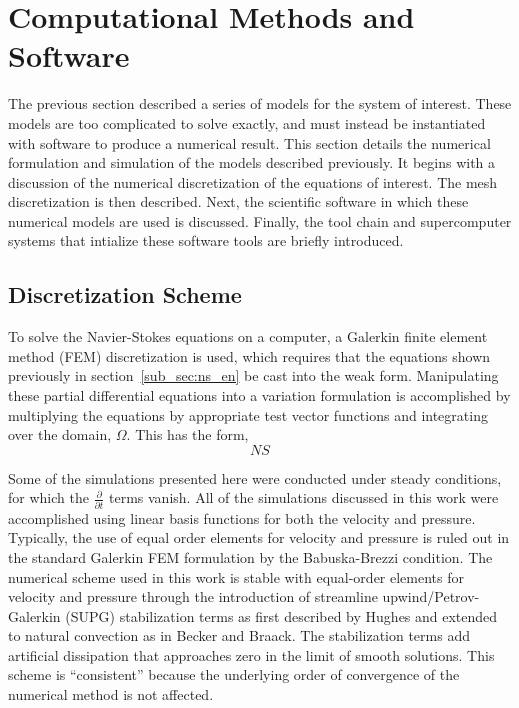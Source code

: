\section{Computational Methods and Software}
\label{sec:software}

The previous section described a series of models 
for the system of interest. These models are too 
complicated to solve exactly, and must instead be 
instantiated with software to produce a numerical 
result. This section details the numerical formulation
and simulation of the models described previously. It begins with a 
discussion of the numerical discretization of the equations 
of interest. The mesh discretization is then described. 
Next, the scientific software in which these numerical 
models are used is discussed. Finally, the tool
chain and supercomputer systems that intialize these 
software tools are briefly introduced. 

\subsection{Discretization Scheme}

To solve the Navier-Stokes equations on a computer, a
Galerkin finite element method (FEM) discretization is used, which
requires that the equations shown previously in section~\ref{sub_sec:ns_en}
be cast into the weak form. Manipulating
these partial differential equations into a variation formulation is
accomplished by multiplying the equations by appropriate test vector
functions and integrating over the domain, $\Omega$. This has the
form,  
\begin{equation}
 NS
  \label{eqn:ns_weak}
\end{equation}

Some of the simulations presented here were conducted under steady
conditions, for which the $\frac{\partial}{\partial t}$ terms vanish. 
All of the simulations discussed in this work were accomplished using
linear basis functions for both the velocity and pressure.
Typically, the use of equal order elements for velocity and pressure is
ruled out in the standard Galerkin FEM formulation by the Babuska-Brezzi
condition\cite{bb-cond}. The numerical scheme used in this work is
stable with equal-order elements for velocity and pressure through the
introduction of streamline upwind/Petrov-Galerkin (SUPG) stabilization
terms as first described by Hughes\cite{Hughes198685,supg} and extended
to natural convection as in Becker and Braack\cite{Becker2002428}. The
stabilization terms add artificial dissipation that approaches zero in
the limit of smooth solutions. This scheme is ``consistent'' because the
underlying order of convergence of the numerical method is not 
affected\cite{hughes2000finite}. 

